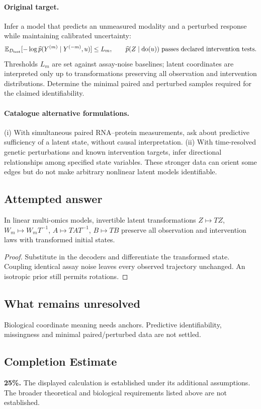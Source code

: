 \documentclass[11pt]{article}
\begin{document}
\paragraph{Original target.}
Infer a model that predicts an unmeasured modality and a perturbed response while maintaining calibrated uncertainty:
\[\mathbb{E}_{D_{\rm test}}[-\log\widehat p(Y^{(m)}\mid Y^{(-m)},u)]\le L_m,\qquad \widehat p(Z\mid\operatorname{do}(u))\ \text{passes declared intervention tests}.\]
Thresholds $L_m$ are set against assay-noise baselines; latent coordinates are interpreted only up to transformations preserving all observation and intervention distributions. Determine the minimal paired and perturbed samples required for the claimed identifiability.
\paragraph{Catalogue alternative formulations.}
(i) With simultaneous paired RNA--protein measurements, ask about predictive sufficiency of a latent state, without causal interpretation. (ii) With time-resolved genetic perturbations and known intervention targets, infer directional relationships among specified state variables. These stronger data can orient some edges but do not make arbitrary nonlinear latent models identifiable.
\subsection{Attempted answer}
\begin{proposition}
In linear multi-omics models, invertible latent transformations $Z\mapsto TZ$, $W_m\mapsto W_mT^{-1}$, $A\mapsto TAT^{-1}$, $B\mapsto TB$ preserve all observation and intervention laws with transformed initial states.
\end{proposition}
\begin{proof}
Substitute in the decoders and differentiate the transformed state. Coupling identical assay noise leaves every observed trajectory unchanged. An isotropic prior still permits rotations.
\end{proof}
\subsection{What remains unresolved}
Biological coordinate meaning needs anchors. Predictive identifiability, missingness and minimal paired/perturbed data are not settled.
\subsection{Completion Estimate}
\textbf{25\%.} The displayed calculation is established under its additional assumptions. The broader theoretical and biological requirements listed above are not established.
\end{document}
